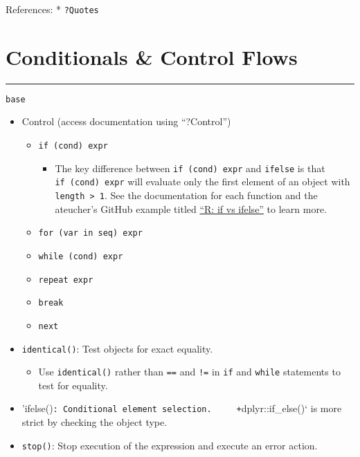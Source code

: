 \documentclass[
]{book}
\providecommand{\tightlist}{%
  \setlength{\itemsep}{0pt}\setlength{\parskip}{0pt}}
\begin{document}
References:
* \texttt{?Quotes}

\hypertarget{conditionals-control-flows}{%
\section{Conditionals \& Control Flows}\label{conditionals-control-flows}}

\begin{center}\rule{0.5\linewidth}{0.5pt}\end{center}

\texttt{base}

\begin{itemize}
\tightlist
\item
  Control (access documentation using ``?Control'')

  \begin{itemize}
  \tightlist
  \item
    \texttt{if\ (cond)\ expr}

    \begin{itemize}
    \tightlist
    \item
      The key difference between \texttt{if\ (cond)\ expr} and \texttt{ifelse} is that \texttt{if\ (cond)\ expr} will evaluate only the first element of an object with \texttt{length\ \textgreater{}\ 1}. See the documentation for each function and the ateucher's GitHub example titled \href{https://gist.github.com/ateucher/c7359f566eded9fcd4a255f4cbd4fe67}{``R: if vs ifelse''} to learn more.
    \end{itemize}
  \item
    \texttt{for\ (var\ in\ seq)\ expr}
  \item
    \texttt{while\ (cond)\ expr}
  \item
    \texttt{repeat\ expr}
  \item
    \texttt{break}
  \item
    \texttt{next}
  \end{itemize}
\item
  \texttt{identical()}: Test objects for exact equality.

  \begin{itemize}
  \tightlist
  \item
    Use \texttt{identical()} rather than \texttt{==} and \texttt{!=} in \texttt{if} and \texttt{while} statements to test for equality.
  \end{itemize}
\item
  'ifelse()\texttt{:\ Conditional\ element\ selection.\ \ \ \ \ +}dplyr::if\_else()` is more strict by checking the object type.
\item
  \texttt{stop()}: Stop execution of the expression and execute an error action.


\end{itemize}
\end{document}

